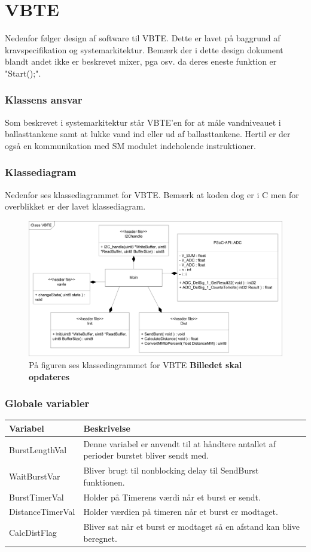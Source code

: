 \chapter{VBTE}
Nedenfor følger design af software til VBTE. Dette er lavet på baggrund af kravspecifikation og systemarkitektur. Bemærk der i dette design dokument blandt andet ikke er beskrevet mixer, pga osv. da deres eneste funktion er "Start();".
\subsection{Klassens ansvar}
Som beskrevet i systemarkitektur står VBTE'en for at måle vandniveauet i ballasttankene samt at lukke vand ind eller ud af ballasttankene. Hertil er der også en kommunikation med SM modulet indeholende instruktioner.
\subsection{Klassediagram}
Nedenfor ses klassediagrammet for VBTE. Bemærk at koden dog er i C men for overblikket er der lavet klassediagram.
\begin{figure}
\centering
\includegraphics[width=1\textwidth]{billeder/ClassVBTE}
\caption{På figuren ses klassediagrammet for VBTE \textbf{Billedet skal opdateres}}
\end{figure}

\subsection{Globale variabler}
\begin{table}[H]
\begin{tabular}{|l|p{10cm}|}
\hline
\cellcolor[gray]{0.8}\textbf{Variabel} &\cellcolor[gray]{0.8} \textbf{Beskrivelse}\\ \hline
BurstLengthVal & Denne variabel er anvendt til at håndtere antallet af perioder burstet bliver sendt med.\\ \hline
WaitBurstVar & Bliver brugt til nonblocking delay til SendBurst funktionen.\\ \hline
BurstTimerVal & Holder på Timerens værdi når et burst er sendt.\\ \hline
DistanceTimerVal & Holder værdien på timeren når et burst er modtaget. \\ \hline
CalcDistFlag & Bliver sat når et burst er modtaget så en afstand kan blive beregnet.\\ \hline
\end{tabular}
\end{table}
